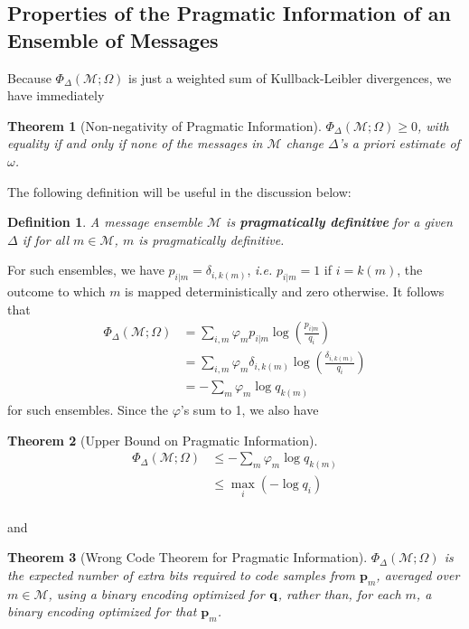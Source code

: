 \documentclass[11pt]{article}
\newtheorem*{definition}{Definition}
\newtheorem{theorem}{Theorem}[subsection]
\begin{document}
\subsection{Properties of the Pragmatic Information of an Ensemble of Messages}
Because ${\Phi_\Delta (\mathcal M; \Omega)}$ is just a weighted sum of Kullback-Leibler divergences, we have immediately
\begin{theorem}[Non-negativity of Pragmatic Information]
$\Phi_\Delta (\mathcal M; \Omega) \ge 0$,
with equality if and only if none of the messages in $\mathcal M$ change $\Delta$'s {\it a priori} estimate of $\omega$.
\end{theorem}
The following definition will be useful in the discussion below:
\begin{definition}
A message ensemble $\mathcal M$ is {\bf pragmatically definitive} for a given $\Delta$ if for all $m \in \mathcal M$, $m$ is pragmatically definitive.
\end{definition}
For such ensembles, we have $p_{i|m} = \delta_{i, k(m)}$, {\it i.e.} $p_{i|m} =1$ if $i = k(m)$, the outcome to which $m$ is mapped deterministically and zero otherwise.  It follows that
\begin{align*}
 \Phi_\Delta (\mathcal M; \Omega) &= \sum_{i, m} \varphi_m  p_{i|m} \log \left(\frac{p_{i|m}}{q_i}\right) \\
                                                  &= \sum_{i, m} \varphi_m \delta_{i, k(m)} \log \left(\frac{\delta_{i, k(m)}}{q_i}\right) \\
                                                  &= - \sum_m \varphi_m \log q_{k(m)}
\end{align*}
for such ensembles.  Since the $\varphi$'s sum to 1, we also have
\begin{theorem}[Upper Bound on Pragmatic Information]
\begin{align*}
\Phi_\Delta (\mathcal M; \Omega) &\leq -\sum_m \varphi_m \log q_{k(m)} \\
                                                 &\leq \max_i \left(-\log q_i \right)\\
\end{align*}
\end{theorem}
and
\begin{theorem}[Wrong Code Theorem for Pragmatic Information]
$\Phi_\Delta (\mathcal M; \Omega)$ is the expected number of extra bits required to code samples from $\mathbf p_m$, averaged over $m \in \mathcal M$, using a binary encoding optimized for $\bf q$, rather than,
for each $m$, a binary encoding optimized for that $\mathbf p_m$.
\end{theorem}
\end{document}
